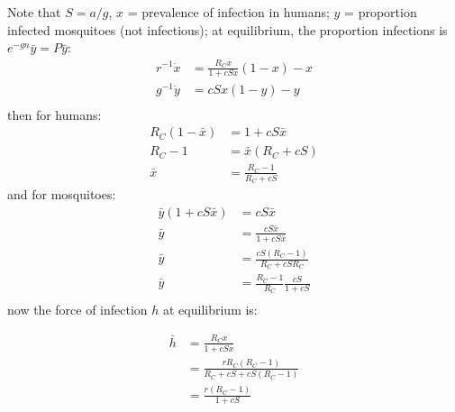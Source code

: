 \documentclass{article}
\begin{document}


Note that $S = a/g$, $x$ = prevalence of infection in humans; $y$ = proportion infected mosquitoes (not infectious); at equilibrium, the proportion infections is $e^{-gn} \bar y = P \bar y$: 
\begin{equation}\begin{array}{rl}
r^{-1} \dot x &= \frac{R_C x}{1 + cSx}(1-x)-x \\  
g^{-1} \dot y &=  cSx (1-y) - y\\  
\end{array}\end{equation}
then for humans: 
\begin{equation}\begin{array}{rl}
R_C (1-\bar x) &= 1 + cS \bar x \\ 
R_C - 1 &= \bar x (R_C + cS) \\
\bar x &= \frac{R_C-1}{R_C + cS}
\end{array}\end{equation}
and for mosquitoes:  
\begin{equation}\begin{array}{rl}
\bar y (1+cS\bar x)  &=  cS\bar x\\
\bar y &= \frac{cS \bar x}{1+ cS \bar x}\\
\bar y &= \frac{cS (R_C -1)}{R_C + cS R_C}\\
\bar y &= \frac{R_C -1}{R_C}\frac{cS}{1+cS}\\
\end{array}\end{equation}
now the force of infection $h$ at equilibrium is: 


\begin{equation}\begin{array}{rl}
\bar h &= \frac{R_C x}{1 + cSx}\\
       &=  \frac{r R_C (R_C-1)}{R_C + cS + cS(R_C -1)} \\
       &=  \frac{r (R_C-1)}{1 + cS} \\ 
\end{array}\end{equation}
\end{document}
